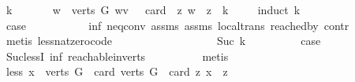 \begin{isabellebody}
\ k\ \isanewline
\ \ \ \ \isamarkupfalse%
\ {\isachardoublequoteopen}{\isasymexists}w\ {\isasymin}\ verts\ G{\isachardot}{\kern0pt}\ w{\isasymrightarrow}\isactrlsup {\isacharplus}{\kern0pt}v\ {\isasymand}\ \ card\ \ {\isacharbraceleft}{\kern0pt}z{\isachardot}{\kern0pt}\ w\ {\isasymrightarrow}\isactrlsup {\isacharplus}{\kern0pt}\ z{\isacharbraceright}{\kern0pt}\ {\isachargreater}{\kern0pt}\ k{\isachardoublequoteclose}\isanewline
\ \ \ \ \isamarkupfalse%
{\isacharparenleft}{\kern0pt}induct\ k\ {\isacharparenright}{\kern0pt}\isanewline
\ \ \ \ \ \ \isamarkupfalse%
\ {}\isanewline
\ \ \ \ \ \ \isamarkupfalse%
\ \isamarkupfalse%
\ {\isacharquery}{\kern0pt}case\ \isanewline
\ \ \ \ \ \ \ \ \isamarkupfalse%
\ inf\ neq{}{\isacharunderscore}{\kern0pt}conv\ assms{\isacharparenleft}{\kern0pt}{}{\isacharparenright}{\kern0pt}\ assms{\isacharparenleft}{\kern0pt}{}{\isacharparenright}{\kern0pt}\ local{\isachardot}{\kern0pt}trans\ reached{\isacharunderscore}{\kern0pt}by\ contr\isanewline
\ \ \ \ \ \ \ \ \isamarkupfalse%
\ {\isacharparenleft}{\kern0pt}metis\ less{\isacharunderscore}{\kern0pt}nat{\isacharunderscore}{\kern0pt}zero{\isacharunderscore}{\kern0pt}code{\isacharparenright}{\kern0pt}\ \ \ \ \ \ \isanewline
\ \ \ \ \isamarkupfalse%
\isanewline
\ \ \ \ \ \ \isamarkupfalse%
\ {\isacharparenleft}{\kern0pt}Suc\ k{\isacharparenright}{\kern0pt}\isanewline
\ \ \ \ \ \ \isamarkupfalse%
\ \isamarkupfalse%
\ {\isacharquery}{\kern0pt}case\isanewline
\ \ \ \ \ \ \ \ \isamarkupfalse%
\ Suc{\isacharunderscore}{\kern0pt}lessI\ inf\ reachable{}{\isacharunderscore}{\kern0pt}in{\isacharunderscore}{\kern0pt}verts{\isacharparenleft}{\kern0pt}{}{\isacharparenright}{\kern0pt}\isanewline
\ \ \ \ \ \ \ \ \isamarkupfalse%
\ {\isacharparenleft}{\kern0pt}metis{\isacharparenright}{\kern0pt}\ \ \isanewline
\ \ \ \ \isamarkupfalse%
\isanewline
\ \ \isamarkupfalse%
\isanewline
\ \ \isamarkupfalse%
\ \isamarkupfalse%
\ less{\isacharcolon}{\kern0pt}\ {\isachardoublequoteopen}{\isasymexists}x\ {\isasymin}\ verts\ G{\isachardot}{\kern0pt}\ \ card\ {\isacharparenleft}{\kern0pt}verts\ G{\isacharparenright}{\kern0pt}\ {\isacharless}{\kern0pt}\ card\ {\isacharbraceleft}{\kern0pt}z{\isachardot}{\kern0pt}\ x\ {\isasymrightarrow}\isactrlsup {\isacharplus}{\kern0pt}\ z{\isacharbraceright}{\kern0pt}{\isachardoublequoteclose}\isanewline

\end{isabellebody}
